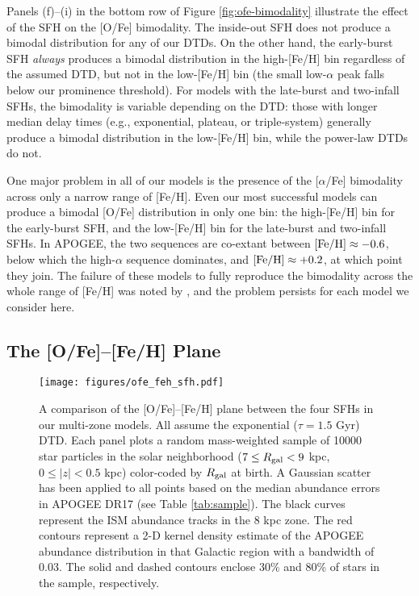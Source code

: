 \documentclass[twocolumn,twocolappendix,linenumbers]{aastex631}
\newcommand{\aFe}{[$\alpha$/Fe]\xspace}
\begin{document}
Panels (f)--(i) in the bottom row of Figure \ref{fig:ofe-bimodality} illustrate the effect of the SFH on the [O/Fe] bimodality. The inside-out SFH does not produce a bimodal distribution for any of our DTDs. On the other hand, the early-burst SFH {\it always} produces a bimodal distribution in the high-[Fe/H] bin regardless of the assumed DTD, but not in the low-[Fe/H] bin (the small low-$\alpha$ peak falls below our prominence threshold). For models with the late-burst and two-infall SFHs, the bimodality is variable depending on the DTD: those with longer median delay times (e.g., exponential, plateau, or triple-system) generally produce a bimodal distribution in the low-[Fe/H] bin, while the power-law DTDs do not. 

One major problem in all of our models is the presence of the \aFe bimodality across only a narrow range of [Fe/H].
Even our most successful models can produce a bimodal [O/Fe] distribution in only one bin: the high-[Fe/H] bin for the early-burst SFH, and the low-[Fe/H] bin for the late-burst and two-infall SFHs. In APOGEE, the two sequences are co-extant between ${\rm [Fe/H]}\approx-0.6$, below which the high-$\alpha$ sequence dominates, and ${\rm [Fe/H]}\approx+0.2$, at which point they join. The failure of these models to fully reproduce the bimodality across the whole range of [Fe/H] was noted by , and the problem persists for each model we consider here.

\subsection{The [O/Fe]--[Fe/H] Plane}
\label{sec:ofe-feh}

\begin{figure}
    \centering
    \texttt{[image: figures/ofe\_feh\_sfh.pdf]}
    \caption{A comparison of the [O/Fe]--[Fe/H] plane between the four SFHs in our multi-zone models. All assume the exponential ($\tau=1.5$ Gyr) DTD. Each panel plots a random mass-weighted sample of \num{10000} star particles in the solar neighborhood ($7\leq R_{\rm gal}<9$ kpc, $0\leq|z|<0.5$ kpc) color-coded by $R_{\rm gal}$ at birth. A Gaussian scatter has been applied to all points based on the median abundance errors in APOGEE DR17 (see Table \ref{tab:sample}). The black curves represent the ISM abundance tracks in the 8 kpc zone. The red contours represent a 2-D kernel density estimate of the APOGEE abundance distribution in that Galactic region with a bandwidth of 0.03. The solid and dashed contours enclose 30\% and 80\% of stars in the sample, respectively.}
    \label{fig:ofe-feh-sfh}
\end{figure}
\end{document}
